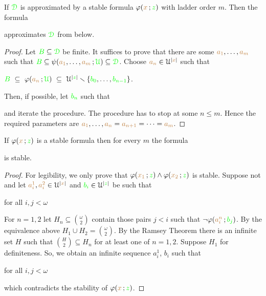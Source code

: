 \documentclass[creche.tex]{subfiles}
\begin{document}
\begin{lemma}
If ${\color{green}\EuScript D}$ is approximated by a stable formula $\varphi({\color{brown} x}\,;{\color{green} z})$ with ladder order $m$.
Then the formula 


approximates ${\color{green}\EuScript D}$ from below.
\end{lemma}

\begin{proof}
Let ${\color{green} B}\subseteq{\color{green}\EuScript D}$ be finite.
It suffices to prove that there are some ${\color{brown} a_1},\dots,{\color{brown} a_m}$ such that ${\color{green} B}\subseteq\psi({\color{brown} a_1},\dots,{\color{brown} a_m}\,;{\color{green}\EuScript U})\subseteq{\color{green}\EuScript D}$. Choose ${\color{brown} a_n}\in\EuScript U^{|{\color{brown} x}|}$ such that 

\hfil${\color{green} B}\ \subseteq\ \varphi({\color{brown} a_n}\,;{\color{green}\EuScript U})\ \subseteq\ \EuScript U^{|{\color{green} z}|}\smallsetminus\{{\color{green} b_0},\dots,{\color{green} b_{n-1}}\}$.

Then, if possible, let ${\color{green} b_n}$ such that


and iterate the procedure.
The procedure has to stop at some $n\le m$.
Hence the required parameters are ${\color{brown} a_1},\dots,{\color{brown} a_n}={\color{brown} a_{n+1}}=\dots={\color{brown} a_{m}}$.
\end{proof}

\begin{lemma}
If $\varphi({\color{brown} x}\,;{\color{green} z})$ is a stable formula then for every $m$ the formula 


is stable.
\end{lemma}

\begin{proof}
For legibility, we only prove that $\varphi({\color{brown} x_1}\,;{\color{green} z})\wedge\varphi({\color{brown} x_2}\,;{\color{green} z})$ is stable.
Suppose not and let ${\color{brown} a^1_i},{\color{brown} a^2_i}\in\EuScript U^{|{\color{brown} x}|}$ and ${\color{green} b_i}\in\EuScript U^{|{\color{green} z}|}$ be such that 

\hfill for all $i,j<\omega$

For $n=1,2$ let $H_n\subseteq{\omega\choose 2}$ contain those pairs $j<i$ such that $\neg\varphi({\color{brown} a^n_i}\,;{\color{green} b_j})$. 
By the equivalence above $H_1\cup H_2={\omega\choose 2}$. 
By the Ramsey Theorem there is an infinite set $H$ such that ${H\choose 2}\subseteq H_n$ for at least one of $n=1,2$. Suppose $H_1$ for definiteness. So, we obtain an infinite sequence $a^1_i$, $b_i$ such that

\hfill for all $i,j<\omega$

which contradicts the stability of $\varphi({\color{brown} x}\,;{\color{green} z})$.
\end{proof}
\end{document}
